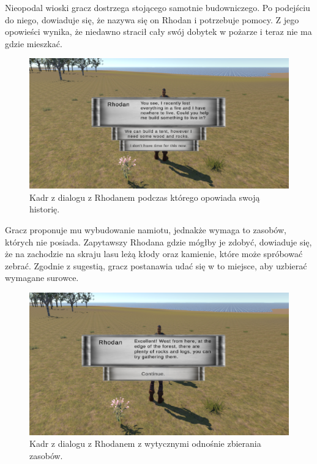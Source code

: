 Nieopodal wioski gracz dostrzega stojącego samotnie budowniczego. Po podejściu do niego, dowiaduje się, że nazywa się on
Rhodan i potrzebuje pomocy. Z jego opowieści wynika, że niedawno stracił cały swój dobytek w
pożarze i teraz nie ma gdzie mieszkać.

\begin{figure}[h!]
    \centering
    \includegraphics[width=1\textwidth]{images/rozgrywka/rhodan3.png}
    \caption{Kadr z dialogu z Rhodanem podczas którego opowiada swoją historię.}
\end{figure}
\FloatBarrier

Gracz proponuje mu wybudowanie namiotu, jednakże wymaga to zasobów, których nie posiada. Zapytawszy Rhodana gdzie mógłby
je zdobyć, dowiaduje się, że na zachodzie na skraju lasu leżą kłody oraz kamienie, które może spróbować zebrać. Zgodnie
z sugestią, gracz postanawia udać się w to miejsce, aby uzbierać wymagane surowce.

\begin{figure}[h!]
    \centering
    \includegraphics[width=1\textwidth]{images/rozgrywka/rhodan4.png}
    \caption{Kadr z dialogu z Rhodanem z wytycznymi odnośnie zbierania zasobów.}
\end{figure}
\FloatBarrier

